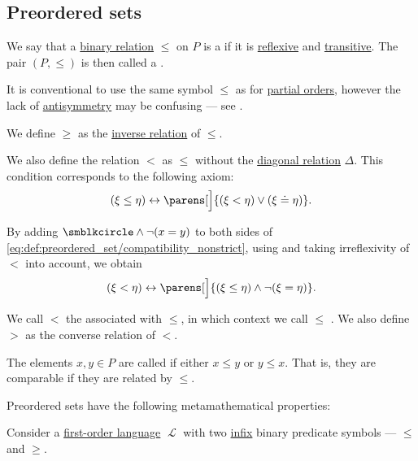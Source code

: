 \subsection{Preordered sets}\label{subsec:preordered_sets}

\begin{definition}\label{def:preordered_set}
  We say that a \hyperref[def:binary_relation]{binary relation} \( \leq \) on \( P \) is a  if it is \hyperref[def:binary_relation/reflexive]{reflexive} and \hyperref[def:binary_relation/transitive]{transitive}. The pair \( (P, \leq) \) is then called a .

  It is conventional to use the same symbol \( \leq \) as for \hyperref[def:partially_ordered_set]{partial orders}, however the lack of \hyperref[def:binary_relation/antisymmetric]{antisymmetry} may be confusing --- see .

  We define \( \geq \) as the \hyperref[def:binary_relation/inverse]{inverse relation} of \( \leq \).

  We also define the relation \( < \) as \( \leq \) without the \hyperref[def:binary_relation/diagonal]{diagonal relation} \( \Delta \). This condition corresponds to the following axiom:
  \begin{equation}\label{eq:def:preordered_set/compatibility_nonstrict}
    (\xi \leq \eta) \leftrightarrow \parens[\Big]{(\xi < \eta) \vee (\xi \doteq \eta)}.
  \end{equation}

  By adding \( \anon \wedge \neg (x = y) \) to both sides of \eqref{eq:def:preordered_set/compatibility_nonstrict}, using  and taking irreflexivity of \( < \) into account, we obtain
  \begin{equation}\label{eq:def:preordered_set/compatibility_strict}
    (\xi < \eta) \leftrightarrow \parens[\Big]{(\xi \leq \eta) \wedge \neg (\xi = \eta)}.
  \end{equation}

  We call \( < \) the  associated with \( \leq \), in which context we call \( \leq \) . We also define \( > \) as the converse relation of \( < \).

  The elements \( x, y \in P \) are called  if either \( x \leq y \) or \( y \leq x \). That is, they are comparable if they are related by \( \leq \).

  Preordered sets have the following metamathematical properties:
  \begin{thmenum}
     Consider a \hyperref[def:first_order_language]{first-order language} \( \mscrL \) with two \hyperref[rem:first_order_formula_conventions/infix]{infix} binary predicate symbols --- \( \leq \) and \( \geq \).


\end{thmenum}
\end{definition}
